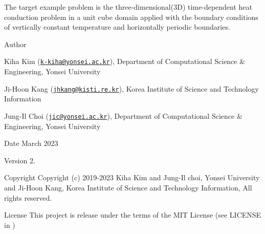 The target example problem is the three-\/dimensional(3D) time-\/dependent heat conduction problem in a unit cube domain applied with the boundary conditions of vertically constant temperature and horizontally periodic boundaries. \begin{DoxyAuthor}{Author}

\begin{DoxyItemize}
\item Kiha Kim (\href{mailto:k-kiha@yonsei.ac.kr}{\tt k-\/kiha@yonsei.\+ac.\+kr}), Department of Computational Science \& Engineering, Yonsei University
\item Ji-\/\+Hoon Kang (\href{mailto:jhkang@kisti.re.kr}{\tt jhkang@kisti.\+re.\+kr}), Korea Institute of Science and Technology Information
\item Jung-\/\+Il Choi (\href{mailto:jic@yonsei.ac.kr}{\tt jic@yonsei.\+ac.\+kr}), Department of Computational Science \& Engineering, Yonsei University
\end{DoxyItemize}
\end{DoxyAuthor}
\begin{DoxyDate}{Date}
March 2023 
\end{DoxyDate}
\begin{DoxyVersion}{Version}
2. 
\end{DoxyVersion}
\begin{DoxyParagraph}{Copyright}
Copyright (c) 2019-\/2023 Kiha Kim and Jung-\/\+Il choi, Yonsei University and Ji-\/\+Hoon Kang, Korea Institute of Science and Technology Information, All rights reserved. 
\end{DoxyParagraph}
\begin{DoxyParagraph}{License }
This project is release under the terms of the M\+IT License (see L\+I\+C\+E\+N\+SE in ) 
\end{DoxyParagraph}

